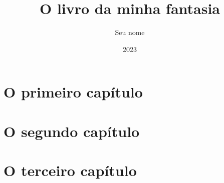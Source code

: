 \documentclass{book}
\begin{document}
\frontmatter

\title{O livro da minha fantasia}
\author{Seu nome}
\date{2023}

\maketitle

\tableofcontents

\mainmatter

\chapter{O primeiro capítulo}

\lipsum[1-20]

\chapter{O segundo capítulo}

\lipsum[21-40]

\chapter{O terceiro capítulo}

\lipsum[41-60]

\backmatter



\end{document}
